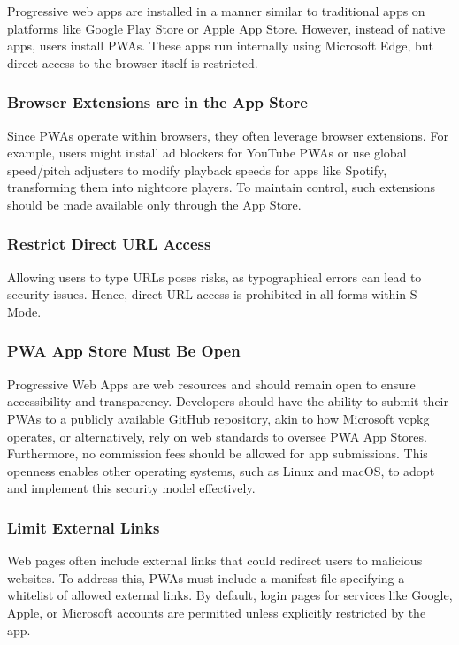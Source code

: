 Progressive web apps are installed in a manner similar to traditional apps on platforms like Google Play Store or Apple App Store. However, instead of native apps, users install PWAs. These apps run internally using Microsoft Edge, but direct access to the browser itself is restricted.

\subsubsection{Browser Extensions are in the App Store}

Since PWAs operate within browsers, they often leverage browser extensions. For example, users might install ad blockers for YouTube PWAs or use global speed/pitch adjusters to modify playback speeds for apps like Spotify, transforming them into nightcore players. To maintain control, such extensions should be made available only through the App Store.

\subsubsection{Restrict Direct URL Access}

Allowing users to type URLs poses risks, as typographical errors can lead to security issues. Hence, direct URL access is prohibited in all forms within S Mode.

\subsubsection{PWA App Store Must Be Open}

Progressive Web Apps are web resources and should remain open to ensure accessibility and transparency. Developers should have the ability to submit their PWAs to a publicly available GitHub repository, akin to how Microsoft vcpkg operates, or alternatively, rely on web standards to oversee PWA App Stores. Furthermore, no commission fees should be allowed for app submissions. This openness enables other operating systems, such as Linux and macOS, to adopt and implement this security model effectively.

\subsubsection{Limit External Links}

Web pages often include external links that could redirect users to malicious websites. To address this, PWAs must include a manifest file specifying a whitelist of allowed external links. By default, login pages for services like Google, Apple, or Microsoft accounts are permitted unless explicitly restricted by the app.

